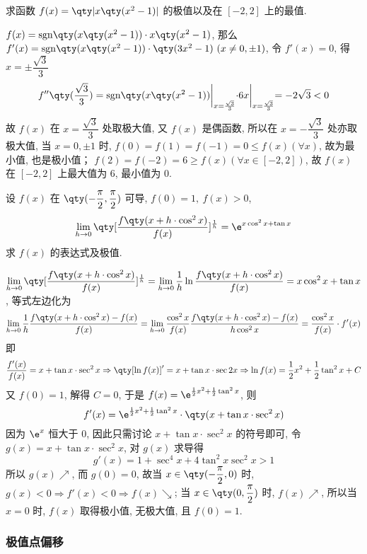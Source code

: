 \begin{example}
    求函数 $f(x)=\qty|x\qty(x^2-1)|$ 的极值以及在 $[-2,2]$ 上的最值.
\end{example}
\begin{solution}
    $f(x)=\mathrm{sgn}\qty(x\qty(x^2-1))\cdot x\qty(x^2-1)$, 那么 $f'(x)=\mathrm{sgn}\qty(x\qty(x^2-1))\cdot\qty(3x^2-1)~ (x\neq0,\pm1)$, 令 $f'(x)=0$, 得
    $x=\pm\dfrac{\sqrt{3}}{3}$
    $$f''\qty(\dfrac{\sqrt{3}}{3})=\mathrm{sgn}\qty(x\qty(x^2-1))\biggl |_{x=\frac{\sqrt{3}}{3}}\cdot 6x\biggl |_{x=\frac{\sqrt{3}}{3}}=-2\sqrt{3}<0$$
    故 $f(x)$ 在 $x=\dfrac{\sqrt{3}}{3}$ 处取极大值, 又 $f(x)$ 是偶函数, 所以在 $x=-\dfrac{\sqrt{3}}{3}$ 处亦取极大值, 
    当 $x=0,\pm1$ 时, $f(0)=f(1)=f(-1)=0\leqslant f(x)(\forall x)$, 故为最小值, 也是极小值；
    $f(2)=f(-2)=6\geqslant f(x)(\forall x\in[-2,2])$, 故 $f(x)$ 在 $[-2,2]$ 上最大值为 6, 最小值为 0.
\end{solution}

\begin{example}
    设 $f(x)$ 在 $\qty(-\dfrac{\pi}{2},\dfrac{\pi}{2})$ 可导, $f(0)=1,~f(x)>0$, $$\displaystyle\lim_{h\to0}\qty[\dfrac{f\qty(x+h\cdot \cos^2x)}{f(x)}]^{\frac{1}{h}}=\e^{x\cos^2x+\tan x}$$
    求 $f(x)$ 的表达式及极值.
\end{example}
\begin{solution}
    $\displaystyle\lim_{h\to0}\qty[\dfrac{f\qty(x+h\cdot \cos^2x)}{f(x)}]^{\frac{1}{h}}=\lim_{h\to0}\dfrac{1}{h}\ln\dfrac{f\qty(x+h\cdot\cos^2x)}{f(x)}=x\cos^2x+\tan x$, 
    等式左边化为 $$\lim_{h\to0}\dfrac{1}{h}\dfrac{f\qty(x+h\cdot\cos^2x)-f(x)}{f(x)}=\lim_{h\to0}\dfrac{\cos^2x}{f(x)}\dfrac{f\qty(x+h\cdot\cos^2x)-f(x)}{h\cos^2x}=\dfrac{\cos^2x}{f(x)}\cdot f'(x)$$
    即 $$\dfrac{f'(x)}{f(x)}=x+\tan x\cdot\sec^2x\Rightarrow \qty[\ln f(x)]'=x+\tan x\cdot\sec2x\Rightarrow \ln f(x)=\dfrac{1}{2}x^2+\dfrac{1}{2}\tan^2x+C$$
    又 $f(0)=1$, 解得 $C=0$, 于是 
    $f(x)=\e^{\frac{1}{2}x^2+\frac{1}{2}\tan^2x}$, 则 
    $$f'(x)=\e^{\frac{1}{2}x^2+\frac{1}{2}\tan^2x}\cdot\qty(x+\tan x\cdot\sec^2x)$$
    因为 $\e^{x}$ 恒大于 0, 因此只需讨论 $x+\tan x\cdot\sec^2x$ 的符号即可, 令 $g(x)=x+\tan x\cdot\sec^2x$, 对 $g(x)$ 求导得 $$g'(x)=1+\sec^4x+4\tan^2x\sec^2x>1$$
    所以 $g(x)\nearrow$, 而 $g(0)=0$, 故当 $x\in\qty(-\dfrac{\pi}{2},0)$ 时, $g(x)<0\Rightarrow f'(x)<0\Rightarrow f(x)\searrow$; 当 $x\in\qty(0,\dfrac{\pi}{2})$ 时, $f(x)\nearrow$, 
    所以当 $x=0$ 时, $f(x)$ 取得极小值, 无极大值, 且 $f(0)=1.$
\end{solution}

\subsubsection{极值点偏移}

